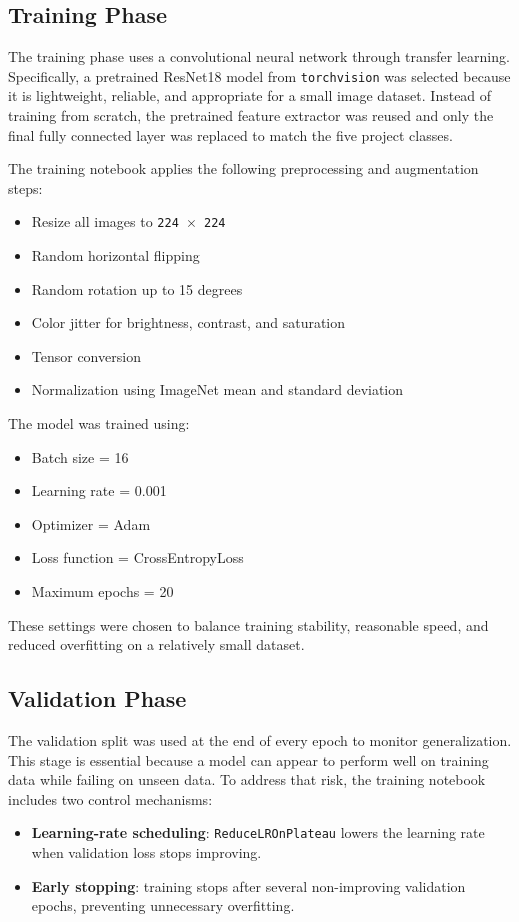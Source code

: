 \documentclass[12pt,a4paper]{article}
\begin{document}
\subsection{Training Phase}
The training phase uses a convolutional neural network through transfer learning. Specifically, a pretrained ResNet18 model from \texttt{torchvision} was selected because it is lightweight, reliable, and appropriate for a small image dataset. Instead of training from scratch, the pretrained feature extractor was reused and only the final fully connected layer was replaced to match the five project classes.

The training notebook applies the following preprocessing and augmentation steps:
\begin{itemize}
    \item Resize all images to \texttt{224 \(\times\) 224}
    \item Random horizontal flipping
    \item Random rotation up to 15 degrees
    \item Color jitter for brightness, contrast, and saturation
    \item Tensor conversion
    \item Normalization using ImageNet mean and standard deviation
\end{itemize}

The model was trained using:
\begin{itemize}
    \item Batch size = 16
    \item Learning rate = 0.001
    \item Optimizer = Adam
    \item Loss function = CrossEntropyLoss
    \item Maximum epochs = 20
\end{itemize}

These settings were chosen to balance training stability, reasonable speed, and reduced overfitting on a relatively small dataset.

\subsection{Validation Phase}
The validation split was used at the end of every epoch to monitor generalization. This stage is essential because a model can appear to perform well on training data while failing on unseen data. To address that risk, the training notebook includes two control mechanisms:
\begin{itemize}
    \item \textbf{Learning-rate scheduling}: \texttt{ReduceLROnPlateau} lowers the learning rate when validation loss stops improving.
    \item \textbf{Early stopping}: training stops after several non-improving validation epochs, preventing unnecessary overfitting.
\end{itemize}
\end{document}

